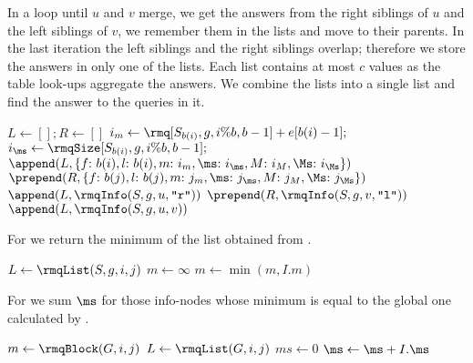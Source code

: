 In a loop until $u$ and $v$ merge, we get the answers from the right siblings of $u$ and the left siblings of $v$, we remember them in the lists and move to their parents.
In the last iteration the left siblings and the right siblings overlap; therefore we store the answers in only one of the lists.
Each list contains at most $c$ values as the table look-ups aggregate the answers.
We combine the lists into a single list and find the answer to the queries in it.

\begin{algorithmic}
 
	\State $L \gets []; R \gets []$ 
	\State $i_m \gets \rmq[S_{b(i)}, g, i \% b, b - 1] + e[b(i) - 1];$ 
	\State $i_{\ms} \gets \rmqSize[S_{b(i)}, g, i \% b, b - 1];$ 
	\State $\append(L, \{\struct{f}{b(i)}, \struct{l}{b(i)}, \struct{m}{i_m}, \struct{\ms}{i_{\ms}}, \struct{M}{i_M}, \struct{\Ms}{i_{\Ms}} \})$ 
	\State $\prepend(R, \{\struct{f}{b(j)}, \struct{l}{b(j)}, \struct{m}{j_m}, \struct{\ms}{j_{\ms}}, \struct{M}{j_M}, \struct{\Ms}{j_{\Ms}} \})$ 
	 
		\State $\append(L, \rmqInfo(S, g, u, \str{r}))$
		\State $\prepend(R, \rmqInfo(S, g, v, \str{l}))$
	\EndWhile
	\State $\append(L, \rmqInfo(S, g, u, v))$ 
	\State {}
\EndFunction
\end{algorithmic}

\bigbreak

For \rmq{} we return the minimum of the list obtained from \rmqList{}.

\begin{algorithmic}
		\State {}
	\Else
		\State $L \gets \rmqList(S, g, i, j)$
		\State $m \gets \infty$
			\State $m \gets \min(m, I.m)$
		\EndFor
		\State {}
	\EndIf
\EndFunction
\end{algorithmic}

For \rmqSizeBlock{} we sum $\ms$ for those info-nodes whose minimum is equal to the global one calculated by \rmq{}.

\begin{algorithmic}
		\State \Return{$\rmqSize[S_{b(i)}, g, i \% b, j \% b]$}
	\Else
		\State $m \gets \rmqBlock(G, i, j)$
		\State $L \gets \rmqList(G, i, j)$
		\State $ms \gets 0$
				\State $\ms \gets \ms + I.\ms$
			\EndIf
		\EndFor
		\State \Return{$\ms$}
	\EndIf
\EndFunction
\end{algorithmic}

